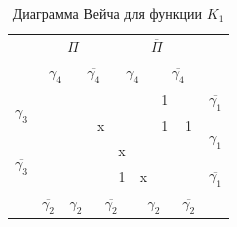 \documentclass[a4paper,14pt]{article}
\begin{document}
\begin{table}[H]
	\begin{center}
		\caption{\label{tab:dvKorrK1} Диаграмма Вейча для функции $K_1$}
	\begin{tabular}{cccccccccc}
		& \multicolumn{4}{c}{$\Pi$}                                                                          & \multicolumn{4}{c}{$\overline{\Pi}$}                                                                            &                     \\
		& \multicolumn{2}{c}{$\gamma_4$}                        & \multicolumn{2}{c}{$\overline{\gamma_4}$}                        & \multicolumn{2}{c}{$\gamma_4$}                          & \multicolumn{2}{c}{$\overline{\gamma_4}$}                         &                     \\ \cline{2-9}
		\multicolumn{1}{c|}{\multirow{2}{*}{$\gamma_3$}}  & \multicolumn{1}{c|}{} & \multicolumn{1}{c|}{} & \multicolumn{1}{c|}{} & \multicolumn{1}{c|}{}  & \multicolumn{1}{c|}{}  & \multicolumn{1}{c|}{}  & \multicolumn{1}{c|}{1} & \multicolumn{1}{c|}{}  & $\overline{\gamma_1}$                 \\ \cline{2-9}
		\multicolumn{1}{c|}{}                     & \multicolumn{1}{c|}{} & \multicolumn{1}{c|}{} & \multicolumn{1}{c|}{} & \multicolumn{1}{c|}{x} & \multicolumn{1}{c|}{}  & \multicolumn{1}{c|}{}  & \multicolumn{1}{c|}{1} & \multicolumn{1}{c|}{1} & \multirow{2}{*}{$\gamma_1$} \\ \cline{2-9}
		\multicolumn{1}{c|}{\multirow{2}{*}{$\overline{\gamma_3}$}} & \multicolumn{1}{c|}{} & \multicolumn{1}{c|}{} & \multicolumn{1}{c|}{} & \multicolumn{1}{c|}{}  & \multicolumn{1}{c|}{x} & \multicolumn{1}{c|}{}  & \multicolumn{1}{c|}{}  & \multicolumn{1}{c|}{}  &                     \\ \cline{2-9}
		\multicolumn{1}{c|}{}                     & \multicolumn{1}{c|}{} & \multicolumn{1}{c|}{} & \multicolumn{1}{c|}{} & \multicolumn{1}{c|}{}  & \multicolumn{1}{c|}{1} & \multicolumn{1}{c|}{x} & \multicolumn{1}{c|}{}  & \multicolumn{1}{c|}{}  & $\overline{\gamma_1}$                 \\ \cline{2-9}
		& $\overline{\gamma_2}$                   & \multicolumn{2}{c}{$\gamma_2$}                        & \multicolumn{2}{c}{$\overline{\gamma_2}$}                         & \multicolumn{2}{c}{$\gamma_2$}                          & $\overline{\gamma_2}$                    &                    
	\end{tabular}
\end{center}
\end{table}
\end{document}

